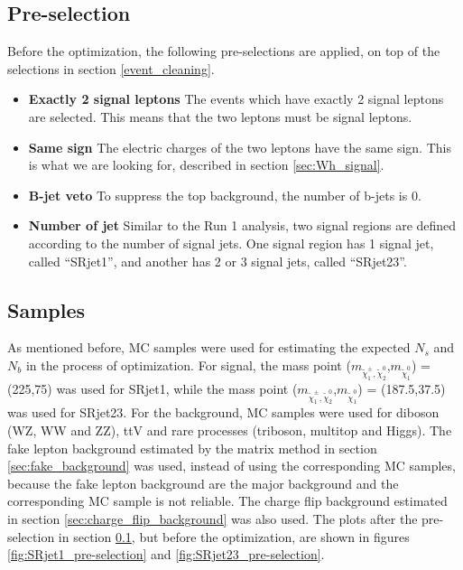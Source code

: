 \subsection{Pre-selection}
\label{sec:SR_pre-selection}
Before the optimization, the following pre-selections are applied, on top of the selections in section \ref{event_cleaning}.
\begin{itemize}
\item \textbf{Exactly 2 signal leptons} The events which have exactly 2 signal leptons are selected. This means that the two leptons must be signal leptons.
\item \textbf{Same sign} The electric charges of the two leptons have the same sign. This is what we are looking for, described in section \ref{sec:Wh_signal}.
\item \textbf{B-jet veto} To suppress the top background, the number of b-jets is 0.
\item \textbf{Number of jet} Similar to the Run 1 analysis, two signal regions are defined according to the number of signal jets. One signal region has 1 signal jet, called ``SRjet1'', and another has 2 or 3 signal jets, called ``SRjet23''.
\end{itemize}

\subsection{Samples}
As mentioned before, MC samples were used for estimating the expected $N_s$ and $N_b$ in the process of optimization.
For signal, the mass point ($m_{\tilde{\chi}_1^\pm , \tilde{\chi}_2^0}$,$m_{\tilde{\chi}_1^0}$) = (225,75) was used for SRjet1, while the mass point ($m_{\tilde{\chi}_1^\pm , \tilde{\chi}_2^0}$,$m_{\tilde{\chi}_1^0}$) = (187.5,37.5) was used for SRjet23.
For the background, MC samples were used for diboson (WZ, WW and ZZ), ttV and rare processes (triboson, multitop and Higgs).
The fake lepton background estimated by the matrix method in section \ref{sec:fake_background} was used, instead of using the corresponding MC samples, because the fake lepton background are the major background and the corresponding MC sample is not reliable.
The charge flip background estimated in section \ref{sec:charge_flip_background} was also used.
The plots after the pre-selection in section \ref{sec:SR_pre-selection}, but before the optimization, are shown in figures \ref{fig:SRjet1_pre-selection} and \ref{fig:SRjet23_pre-selection}.

